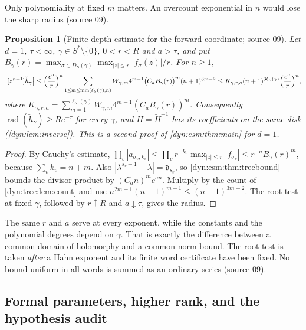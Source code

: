 \documentclass[11pt,letterpaper]{article}
\newtheorem{proposition}[proposition]{Proposition}
\theoremstyle{definition}
\theoremstyle{remark}
\newcommand{\rad}{\operatorname{rad}}
\numberwithin{equation}{section}
\begin{document}
Only polynomiality at fixed $m$ matters. An overcount exponential in $n$
would lose the sharp radius (source 09).

\begin{proposition}[Finite-depth estimate for the forward coordinate;
source 09]\label{dyn:tree:prop:estimate}
Let $d=1$, $\tau<\infty$, $\gamma\in S^{*}\setminus\{0\}$, $0<r<R$ and
$a>\tau$, and put
$B_\gamma(r)=\max_{\sigma\in D_S(\gamma)}\max_{|z|\le r}|f_\sigma(z)|/r$.
For $n\ge1$,
\begin{equation}\label{dyn:tree:eq:estimate}
 \bigl|[z^{n+1}]\check h_\gamma\bigr|
 \le\Bigl(\frac{e^{a}}{r}\Bigr)^{n}
 \sum_{1\le m\le\min(\ell_S(\gamma),n)}W_{\gamma,m}4^{m-1}
 \bigl(C_aB_\gamma(r)\bigr)^{m}(n+1)^{3m-2}
 \le K_{\gamma,r,a}(n+1)^{3\ell_S(\gamma)}\Bigl(\frac{e^{a}}{r}\Bigr)^{n},
\end{equation}
where $K_{\gamma,r,a}=\sum_{m=1}^{\ell_S(\gamma)}W_{\gamma,m}4^{m-1}(C_aB_\gamma(r))^{m}$.
Consequently $\rad(\check h_\gamma)\ge Re^{-\tau}$ for every $\gamma$, and
$H=\check H^{-1}$ has its coefficients on the same disk
(\cref{dyn:lem:inverse}). This is a second proof of \cref{dyn:esm:thm:main}
for $d=1$.
\end{proposition}
\begin{proof}
By Cauchy's estimate,
$\prod_v|a_{\sigma_v,k_v}|\le\prod_vr^{-k_v}\max_{|z|\le r}|f_{\sigma_v}|\le r^{-n}B_\gamma(r)^{m}$,
because $\sum_vk_v=n+m$. Also $|\lambda^{s_v+1}-\lambda|=\mathfrak d_{s_v}$,
so \cref{dyn:esm:thm:treebound} bounds the divisor product by
$(C_an)^{m}e^{an}$. Multiply by the count of \cref{dyn:tree:lem:count} and
use $n^{2m-1}(n+1)^{m-1}\le(n+1)^{3m-2}$. The root test at fixed $\gamma$,
followed by $r\uparrow R$ and $a\downarrow\tau$, gives the radius.
\end{proof}

The same $r$ and $a$ serve at every exponent, while the constants and the
polynomial degrees depend on $\gamma$. That is exactly the difference
between a common domain of holomorphy and a common norm bound. The root test
is taken \emph{after} a Hahn exponent and its finite word certificate have
been fixed. No bound uniform in all words is summed as an ordinary series
(source 09).

\subsection{Formal parameters, higher rank, and the hypothesis audit}
\label{dyn:esm:subsec:params}
\end{document}
